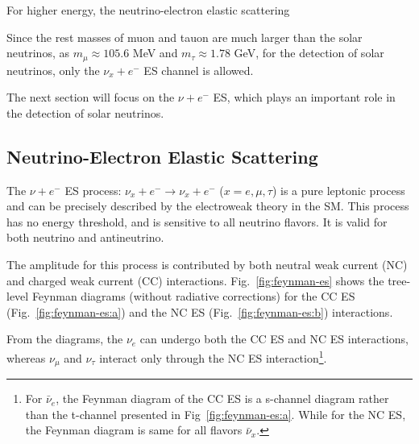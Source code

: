 For higher energy, 
the neutrino-electron elastic scattering

Since the rest masses of muon and tauon are much larger than the solar neutrinos, as $m_\mu\approx 105.6$ MeV and $m_\tau\approx 1.78$ GeV\cite{pdg2020}, for the detection of solar neutrinos, only the $\nu_x+e^-$ ES channel is allowed. 

The next section will focus on the $\nu+e^-$ ES, which plays an important role in the detection of solar neutrinos.

\subsection{Neutrino-Electron Elastic Scattering}\label{sect:NuEStheory}
The $\nu+e^-$ ES process: $\nu_x + e^{-}\to\nu_x+e^-$ ($x=e,\mu,\tau$) is a pure leptonic process and can be precisely described by the electroweak theory in the SM. This process has no energy threshold, and is sensitive to all neutrino flavors. It is valid for both neutrino and antineutrino.

The amplitude for this process is contributed by both neutral weak current (NC) and charged weak current (CC) interactions. Fig.~\ref{fig:feynman-es} shows the tree-level Feynman diagrams (without radiative corrections) for the CC ES (Fig.~\ref{fig:feynman-es:a}) and the NC ES (Fig.~\ref{fig:feynman-es:b}) interactions.

From the diagrams, the $\nu_e$ can undergo both the CC ES and NC ES interactions, whereas $\nu_{\mu}$ and $\nu_\tau$ interact only through the NC ES interaction\footnote{For $\bar{\nu}_e$, the Feynman diagram of the CC ES is a s-channel diagram rather than the t-channel presented in Fig~\ref{fig:feynman-es:a}. While for the NC ES, the Feynman diagram is same for all flavors $\bar{\nu}_x$.}\cite{giunti2007fundamentals,xing2011neutrinos}. 

